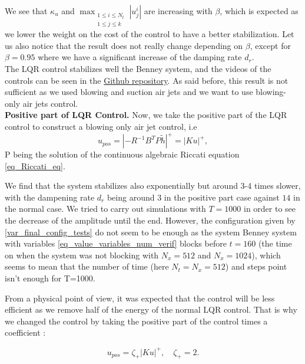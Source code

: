 \documentclass[12pt]{article}
\begin{document}
We see that $\kappa_u$ and $\max_{\substack{1\leq i \leq N_t \\ 1\leq j \leq k}}|u_j^i|$ are increasing with $\beta$, which is expected as we lower the weight
on the cost of the control to have a better stabilization. Let us also notice that the result
does not really change depending on $\beta$, except for $\beta = 0.95$ where we have a significant
increase of the damping rate $d_r$. \\

The LQR control stabilizes well the Benney system, and the videos of the controls can be seen in the 
\href{https://github.com/Bilal59170/Repo_Warwick_internship}{Github repository}. As said before, 
this result is not sufficient as we used blowing and suction air jets and we want to use blowing-only air jets control.
\\


\textbf{Positive part of LQR Control.}
Now, we take the positive part of the LQR control to construct a blowing only air jet control, i.e
\begin{equation}
    u_{pos} = |-R^{-1}B^TP\tilde{h}|^+ = |Ku|^+,
\end{equation}
P being the solution of the continuous algebraic Riccati equation \eqref{eq_Riccati_eq}.

We find that the system stabilizes also exponentially but around 3-4 times slower, with the dampening rate $d_r$ being around $3$ in the positive part case against $14$ in the normal case. We tried to carry out simulations with $T = 1000$ in order to see the decrease of the amplitude until the
end. However, the configuration given by \eqref{var_final_config_tests} do not seem to be enough as the 
system Benney system with variables \eqref{eq_value_variables_num_verif} blocks before $t=160$ (the time on when
the system was not blocking with $N_x =512$ and $N_x=1024$), which seems to mean that the number of 
time (here $N_t = N_x = 512$) and steps point isn't enough for T=1000. 

From a physical point of view, it was expected that the control will be less efficient as we remove half 
of the energy of the normal LQR control. That is why we changed the control by taking the positive 
part of the control times a coefficient : 

\begin{equation}
    u_{pos} = \zeta_+|Ku|^+, \quad \zeta_+ = 2.
\end{equation}
\end{document}
